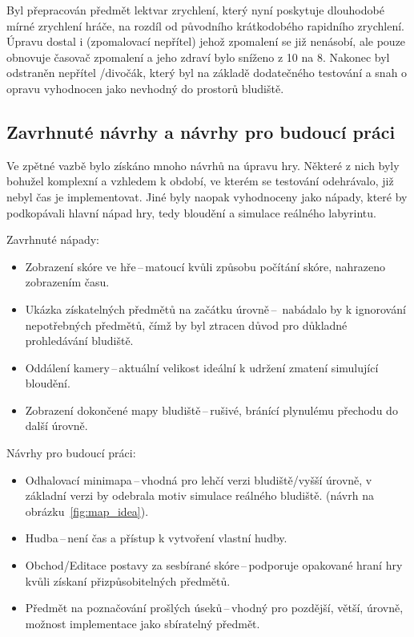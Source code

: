 Byl přepracován předmět lektvar zrychlení, který nyní poskytuje dlouhodobé mírné zrychlení hráče, na rozdíl od původního krátkodobého rapidního zrychlení. Úpravu dostal i  (zpomalovací nepřítel) jehož zpomalení se již nenásobí, ale pouze obnovuje časovač zpomalení a jeho zdraví bylo sníženo z 10 na 8. Nakonec byl odstraněn nepřítel /divočák, který byl na základě dodatečného testování a snah o opravu vyhodnocen jako nevhodný do prostorů bludiště.

\subsection*{Zavrhnuté návrhy a návrhy pro budoucí práci}
Ve zpětné vazbě bylo získáno mnoho návrhů na úpravu hry. Některé z nich byly bohužel komplexní a vzhledem k období, ve kterém se testování odehrávalo, již nebyl čas je implementovat. Jiné byly naopak vyhodnoceny jako nápady, které by podkopávali hlavní nápad hry, tedy bloudění a simulace reálného labyrintu.

\noindent Zavrhnuté nápady:
\begin{itemize}
    \item Zobrazení skóre ve hře\,--\,matoucí kvůli způsobu počítání skóre, nahrazeno zobrazením času.
    \item  Ukázka získatelných předmětů na začátku úrovně\,--\, nabádalo by k ignorování nepotřebných předmětů, čímž by byl ztracen důvod pro důkladné prohledávání bludiště.
    \item  Oddálení kamery\,--\,aktuální velikost ideální k udržení zmatení simulující bloudění.
    \item Zobrazení dokončené mapy bludiště\,--\,rušivé, bránící plynulému přechodu do další úrovně.
\end{itemize}

\noindent Návrhy pro budoucí práci:
\begin{itemize}
    \item Odhalovací minimapa\,--\,vhodná pro lehčí verzi bludiště/vyšší úrovně, v základní verzi by odebrala motiv simulace reálného bludiště.
    (návrh na obrázku~\ref{fig:map_idea}).
    \item Hudba\,--\,není čas a přístup k vytvoření vlastní hudby.
    \item Obchod/Editace postavy za sesbírané skóre\,--\,podporuje opakované hraní hry kvůli získaní přizpůsobitelných předmětů.
    \item  Předmět na poznačování prošlých úseků\,--\,vhodný pro pozdější, větší, úrovně, možnost implementace jako sbíratelný předmět.
\end{itemize}

